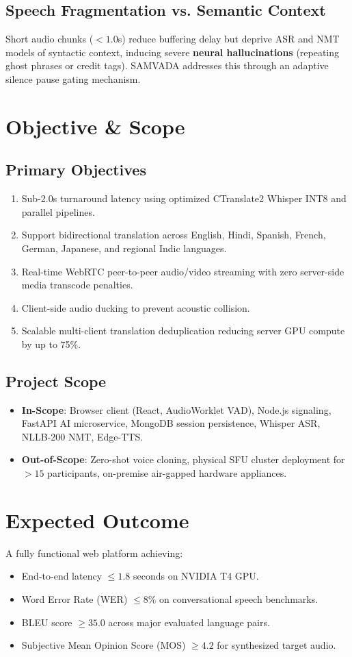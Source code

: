 \documentclass[12pt,a4paper]{report}
\begin{document}
\subsection{Speech Fragmentation vs. Semantic Context}
Short audio chunks ($<1.0$s) reduce buffering delay but deprive ASR and NMT models of syntactic context, inducing severe \textbf{neural hallucinations} (repeating ghost phrases or credit tags). SAMVADA addresses this through an adaptive silence pause gating mechanism.

\section{Objective \& Scope}
\subsection{Primary Objectives}
\begin{enumerate}
    \item Sub-2.0s turnaround latency using optimized CTranslate2 Whisper INT8 and parallel pipelines.
    \item Support bidirectional translation across English, Hindi, Spanish, French, German, Japanese, and regional Indic languages.
    \item Real-time WebRTC peer-to-peer audio/video streaming with zero server-side media transcode penalties.
    \item Client-side audio ducking to prevent acoustic collision.
    \item Scalable multi-client translation deduplication reducing server GPU compute by up to 75\%.
\end{enumerate}

\subsection{Project Scope}
\begin{itemize}
    \item \textbf{In-Scope}: Browser client (React, AudioWorklet VAD), Node.js signaling, FastAPI AI microservice, MongoDB session persistence, Whisper ASR, NLLB-200 NMT, Edge-TTS.
    \item \textbf{Out-of-Scope}: Zero-shot voice cloning, physical SFU cluster deployment for $>15$ participants, on-premise air-gapped hardware appliances.
\end{itemize}

\section{Expected Outcome}
A fully functional web platform achieving:
\begin{itemize}
    \item End-to-end latency $\le 1.8$ seconds on NVIDIA T4 GPU.
    \item Word Error Rate (WER) $\le 8\%$ on conversational speech benchmarks.
    \item BLEU score $\ge 35.0$ across major evaluated language pairs.
    \item Subjective Mean Opinion Score (MOS) $\ge 4.2$ for synthesized target audio.
\end{itemize}
\end{document}

